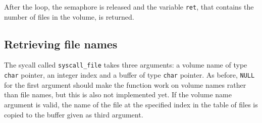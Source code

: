After the loop, the semaphore is released and the variable \verb|ret|, that
contains the number of files in the volume, is returned.

\subsection{Retrieving file names}
The sycall called \verb|syscall_file| takes three arguments: a volume name of
type \verb|char| pointer, an integer index and a buffer of type \verb|char|
pointer. As before, \verb|NULL| for the first argument should make the function
work on volume names rather than file names, but this is also not implemented
yet. If the volume name argument is valid, the name of the file at the
specified index in the table of files is copied to the buffer given as third
argument.
